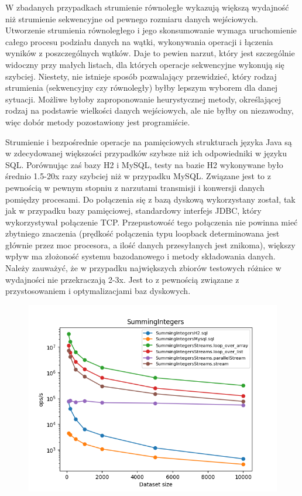 \documentclass[12pt]{extarticle}
\begin{document}
    W zbadanych przypadkach strumienie równoległe wykazują większą wydajność niż strumienie sekwencyjne od pewnego rozmiaru danych wejściowych. Utworzenie strumienia równoległego i jego skonsumowanie wymaga uruchomienie całego procesu podziału danych na wątki, wykonywania operacji i łączenia wyników z poszczególnych wątków. Daje to pewien narzut, który jest szczególnie widoczny przy małych listach, dla których operacje sekwencyjne wykonują się szybciej. Niestety, nie istnieje sposób pozwalający przewidzieć, który rodzaj strumienia (sekwencyjny czy równoległy) byłby lepszym wyborem dla danej sytuacji. Możliwe byłoby zaproponowanie heurystycznej metody, określającej rodzaj na podstawie wielkości danych wejściowych, ale nie byłby on niezawodny, więc dobór metody pozostawiony jest programiście.

    Strumienie i bezpośrednie operacje na pamięciowych strukturach języka Java są w zdecydowanej większości przypadków szybsze niż ich odpowiedniki w języku SQL. Porównując zaś bazy H2 i MySQL, testy na bazie H2 wykonywane było średnio 1.5-20x razy szybciej niż w przypadku MySQL. Związane jest to z pewnością w pewnym stopniu z narzutami transmisji i konwersji danych pomiędzy procesami. Do połączenia się z bazą dyskową wykorzystany został, tak jak w przypadku bazy pamięciowej, standardowy interfejs JDBC, który wykorzystywał połączenie TCP. Przepustowość tego połączenia nie powinna mieć zbytniego znaczenia (prędkość połączenia typu loopback determinowana jest głównie przez moc procesora, a ilość danych przesyłanych jest znikoma), większy wpływ ma złożoność systemu bazodanowego i metody składowania danych. Należy zauważyć, że w przypadku największych zbiorów testowych różnice w wydajności nie przekraczają 2-3x. Jest to z pewnością związane z przystosowaniem i optymalizacjami baz dyskowych.

\begin{figure}[H]
\centering
\includegraphics[width=13cm]{plots/SummingIntegers}
\end{figure}
\end{document}
